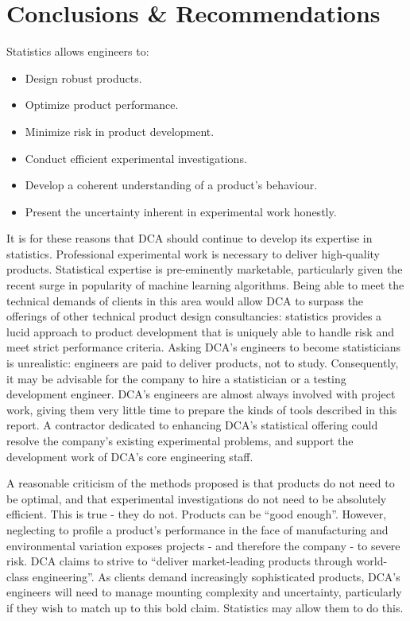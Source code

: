 \documentclass[11pt,a4paper,article]{memoir} %
\begin{document}
\chapter{Conclusions \& Recommendations}
\vspace{-28pt}
Statistics allows engineers to:
\begin{itemize}
\item Design robust products.
\item Optimize product performance.
\item Minimize risk in product development.
\item Conduct efficient experimental investigations.
\item Develop a coherent understanding of a product's behaviour.
\item Present the uncertainty inherent in experimental work honestly.
\end{itemize}
It is for these reasons that DCA should continue to develop its expertise in statistics. Professional experimental work is necessary to deliver high-quality products. Statistical expertise is pre-eminently marketable, particularly given the recent surge in popularity of machine learning algorithms. Being able to meet the technical demands of clients in this area would allow DCA to surpass the offerings of other technical product design consultancies: statistics provides a lucid approach to product development that is uniquely able to handle risk and meet strict performance criteria. Asking DCA's engineers to become statisticians is unrealistic: engineers are paid to deliver products, not to study. Consequently, it may be advisable for the company to hire a statistician or a testing development engineer. DCA's engineers are almost always involved with project work, giving them very little time to prepare the kinds of tools described in this report. A contractor dedicated to enhancing DCA's statistical offering could resolve the company's existing experimental problems, and support the development work of DCA's core engineering staff.

A reasonable criticism of the methods proposed is that products do not need to be optimal, and that experimental investigations do not need to be absolutely efficient. This is true - they do not. Products can be ``good enough''. However, neglecting to profile a product's performance in the face of manufacturing and environmental variation exposes projects - and therefore the company - to severe risk. DCA claims to strive to ``deliver market-leading products through world-class engineering''. As clients demand increasingly sophisticated products, DCA's engineers will need to manage mounting complexity and uncertainty, particularly if they wish to match up to this bold claim. Statistics may allow them to do this.
\end{document}
